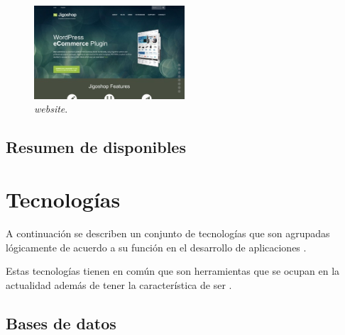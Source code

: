 \begin{itemize}
	\begin{figure}[H]
		\centering
		\includegraphics[width=0.5\textwidth]{figuras/cap1/JigoshopWebsite.jpg}
		\caption{\nameJigoshop \textit{website}\cite{online_Jigoshop}.}
	\end{figure}

\end{itemize}


\subsection{Resumen de \frameworksPC disponibles}



\section{Tecnologías }\label{cap:estadoArte:tecnologias}
A continuación se describen un conjunto de tecnologías que son agrupadas lógicamente de acuerdo a su función en el desarrollo de aplicaciones \webINT.

Estas tecnologías tienen en común que son herramientas que se ocupan en la actualidad además de tener la característica de ser \openSourcePC. 

\subsection{Bases de datos}

